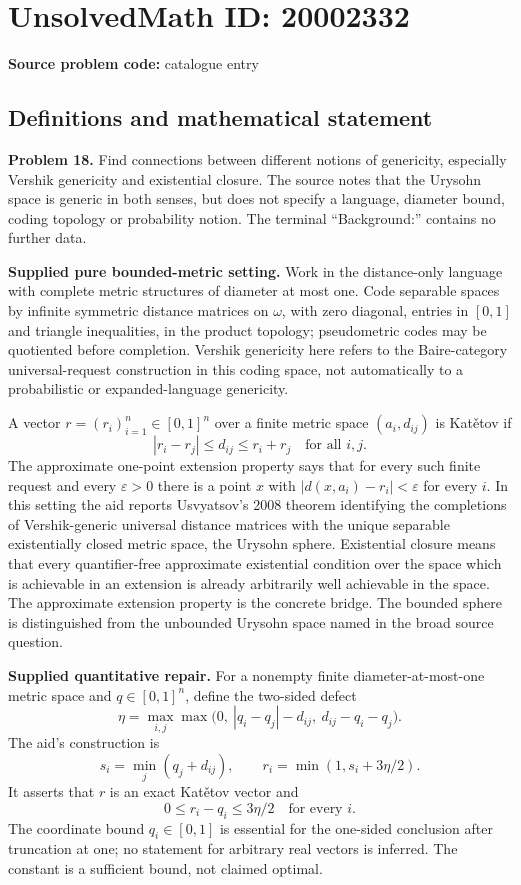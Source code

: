 \documentclass[11pt]{article}
\newcommand{\eps}{\varepsilon}
\begin{document}
\section*{UnsolvedMath ID: 20002332}
\textbf{Source problem code:} catalogue entry
\subsection{Definitions and mathematical statement}
\textbf{Problem 18.} Find connections between different notions of genericity, especially Vershik genericity and existential closure. The source notes that the Urysohn space is generic in both senses, but does not specify a language, diameter bound, coding topology or probability notion. The terminal ``Background:'' contains no further data.

\textbf{Supplied pure bounded-metric setting.} Work in the distance-only language with complete metric structures of diameter at most one. Code separable spaces by infinite symmetric distance matrices on $\omega$, with zero diagonal, entries in $[0,1]$ and triangle inequalities, in the product topology; pseudometric codes may be quotiented before completion. Vershik genericity here refers to the Baire-category universal-request construction in this coding space, not automatically to a probabilistic or expanded-language genericity.

A vector $r=(r_i)_{i=1}^n\in[0,1]^n$ over a finite metric space $(a_i,d_{ij})$ is Kat\v etov if
\[
 |r_i-r_j|\le d_{ij}\le r_i+r_j\quad\text{for all }i,j.
\]
The approximate one-point extension property says that for every such finite request and every $\eps>0$ there is a point $x$ with $|d(x,a_i)-r_i|<\eps$ for every $i$. In this setting the aid reports Usvyatsov's 2008 theorem identifying the completions of Vershik-generic universal distance matrices with the unique separable existentially closed metric space, the Urysohn sphere. Existential closure means that every quantifier-free approximate existential condition over the space which is achievable in an extension is already arbitrarily well achievable in the space. The approximate extension property is the concrete bridge. The bounded sphere is distinguished from the unbounded Urysohn space named in the broad source question.

\textbf{Supplied quantitative repair.} For a nonempty finite diameter-at-most-one metric space and $q\in[0,1]^n$, define the two-sided defect
\[
 \eta=\max_{i,j}\max\bigl(0,\ |q_i-q_j|-d_{ij},\ d_{ij}-q_i-q_j\bigr).
\]
The aid's construction is
\[
 s_i=\min_j(q_j+d_{ij}),\qquad
 r_i=\min(1,s_i+3\eta/2).
\]
It asserts that $r$ is an exact Kat\v etov vector and
\[
 0\le r_i-q_i\le3\eta/2\quad\text{for every }i.
\]
The coordinate bound $q_i\in[0,1]$ is essential for the one-sided conclusion after truncation at one; no statement for arbitrary real vectors is inferred. The constant is a sufficient bound, not claimed optimal.
\end{document}
